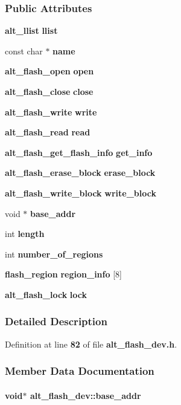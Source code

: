 \subsubsection*{Public Attributes}
\begin{DoxyCompactItemize}
\item 
{\bf alt\+\_\+llist} {\bf llist}
\item 
const char $\ast$ {\bf name}
\item 
{\bf alt\+\_\+flash\+\_\+open} {\bf open}
\item 
{\bf alt\+\_\+flash\+\_\+close} {\bf close}
\item 
{\bf alt\+\_\+flash\+\_\+write} {\bf write}
\item 
{\bf alt\+\_\+flash\+\_\+read} {\bf read}
\item 
{\bf alt\+\_\+flash\+\_\+get\+\_\+flash\+\_\+info} {\bf get\+\_\+info}
\item 
{\bf alt\+\_\+flash\+\_\+erase\+\_\+block} {\bf erase\+\_\+block}
\item 
{\bf alt\+\_\+flash\+\_\+write\+\_\+block} {\bf write\+\_\+block}
\item 
void $\ast$ {\bf base\+\_\+addr}
\item 
int {\bf length}
\item 
int {\bf number\+\_\+of\+\_\+regions}
\item 
{\bf flash\+\_\+region} {\bf region\+\_\+info} [8]
\item 
{\bf alt\+\_\+flash\+\_\+lock} {\bf lock}
\end{DoxyCompactItemize}


\subsubsection{Detailed Description}


Definition at line {\bf 82} of file {\bf alt\+\_\+flash\+\_\+dev.\+h}.



\subsubsection{Member Data Documentation}
\paragraph[{base\+\_\+addr}]{\setlength{\rightskip}{0pt plus 5cm}void$\ast$ alt\+\_\+flash\+\_\+dev\+::base\+\_\+addr}\label{structalt__flash__dev_a727714fd293c86a830bf9b627a11ba39}


